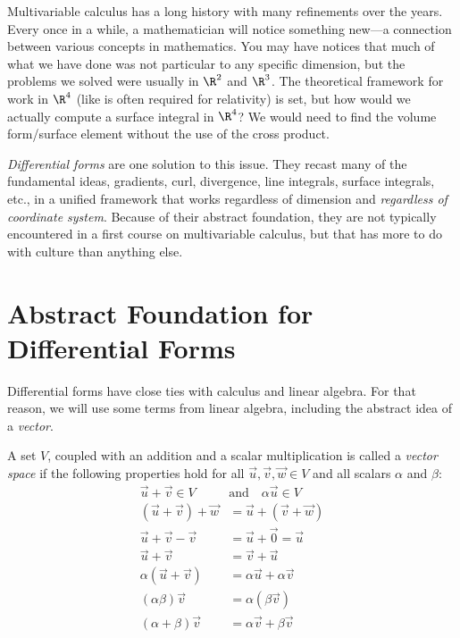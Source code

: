 
Multivariable calculus has a long history with many refinements over the years.
Every once in a while, a mathematician will notice something new---a connection
between various concepts in mathematics.  You may have notices that much
of what we have done was not particular to any specific dimension, but the problems
we solved were usually in $\R^2$ and $\R^3$.  The theoretical framework
for work in $\R^4$ (like is often required for relativity) is set, but how
would we actually compute a surface integral in $\R^4$?  We would need
to find the volume form/surface element without the use of the cross product.

\emph{Differential forms} are one solution to this issue.
They recast many of the fundamental ideas, gradients, curl, divergence,
line integrals, surface integrals, etc., in a unified framework that works
regardless of dimension and \emph{regardless of coordinate system}.
Because of their abstract foundation, they are not typically encountered in a
first course on multivariable calculus, but that has more to do with culture
than anything else.

\section{Abstract Foundation for Differential Forms}

Differential forms have close ties with calculus and linear algebra.
For that reason, we will use some terms from linear algebra, including the
abstract idea of a \emph{vector}.

\begin{definition}
	A set $V$, coupled with an addition and a
	scalar multiplication is called a \emph{vector space} if
	the following properties hold for all $\vec u,\vec v,\vec w\in V$
	and all scalars $\alpha$ and $\beta$:
	\begin{align*}
		\vec u+\vec v\in V\quad&\text{and}\quad \alpha\vec u\in V\tag{Closure}\\
		(\vec u+\vec v)+\vec w&=\vec u+(\vec v+\vec w)\tag{Associativity}\\
		\vec u + \vec v - \vec v &= \vec u+\vec 0 = \vec u\tag{Identity}\\
		\vec u+\vec v&=\vec v+\vec u\tag{Commutativity}\\
		\alpha(\vec u+\vec v)&=\alpha\vec u+\alpha \vec v\tag{Distributivity}\\
		(\alpha\beta)\vec v&=\alpha(\beta \vec v)\tag{Scalar Associativity}\\
		(\alpha+\beta)\vec v&=\alpha\vec v+\beta \vec v\tag{Scalar Distributivity}
	\end{align*}
\end{definition}


